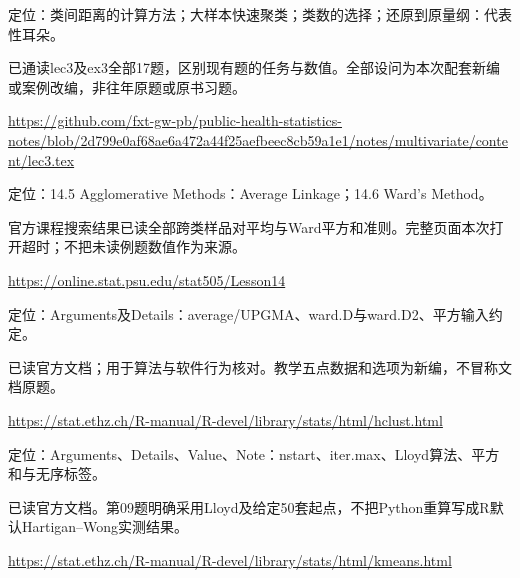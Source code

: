 \par\noindent\begin{minipage}{\linewidth}\label{src:NOTE-M3}
\par
定位：类间距离的计算方法；大样本快速聚类；类数的选择；还原到原量纲：代表性耳朵。\par
已通读lec3及ex3全部17题，区别现有题的任务与数值。全部设问为本次配套新编或案例改编，非往年原题或原书习题。\par
{\small\url{https://github.com/fxt-gw-pb/public-health-statistics-notes/blob/2d799e0af68ae6a472a44f25aefbeec8cb59a1e1/notes/multivariate/content/lec3.tex}}\par
\end{minipage}\par\medskip

\par\noindent\begin{minipage}{\linewidth}\label{src:PSU-CLUSTER}
\par
定位：14.5 Agglomerative Methods：Average Linkage；14.6 Ward’s Method。\par
官方课程搜索结果已读全部跨类样品对平均与Ward平方和准则。完整页面本次打开超时；不把未读例题数值作为来源。\par
{\small\url{https://online.stat.psu.edu/stat505/Lesson14}}\par
\end{minipage}\par\medskip

\par\noindent\begin{minipage}{\linewidth}\label{src:R-HCLUST}
\par
定位：Arguments及Details：average/UPGMA、ward.D与ward.D2、平方输入约定。\par
已读官方文档；用于算法与软件行为核对。教学五点数据和选项为新编，不冒称文档原题。\par
{\small\url{https://stat.ethz.ch/R-manual/R-devel/library/stats/html/hclust.html}}\par
\end{minipage}\par\medskip

\par\noindent\begin{minipage}{\linewidth}\label{src:R-KMEANS}
\par
定位：Arguments、Details、Value、Note：nstart、iter.max、Lloyd算法、平方和与无序标签。\par
已读官方文档。第09题明确采用Lloyd及给定50套起点，不把Python重算写成R默认Hartigan–Wong实测结果。\par
{\small\url{https://stat.ethz.ch/R-manual/R-devel/library/stats/html/kmeans.html}}\par
\end{minipage}\par\medskip

